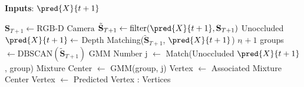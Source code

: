 \begin{algorithm}[t]
\caption{State Estimation with Presence of Occlusion} 
\label{code:state estimation}
\textbf{Inputs}: $\pred{X}{t+1}$
\begin{algorithmic}[1]
\State $\textbf{S}_{T+1} \leftarrow \text{RGB-D Camera}$
\State $\tilde{\textbf{S}}_{T+1} \leftarrow \text{filter}(\pred{X}{t+1}, \textbf{S}_{T+1})$
\State Unoccluded $\pred{X}{t+1} \leftarrow $ Depth Matching($\tilde{\textbf{S}}_{T+1}$, $\pred{X}{t+1}$)
\State $n_{\tilde{}}+1$ groups $\leftarrow \text{DBSCAN}(\tilde{\textbf{S}}_{T+1})$
\State GMM Number j $\leftarrow $ Match(Unoccluded $\pred{X}{t+1}$, group)
\State Mixture Center $\leftarrow$ GMM(group,  j)
\EndFor
\State Vertex $\leftarrow$ Associated Mixture Center
\Else
\State Vertex $\leftarrow$ Predicted Vertex
\EndIf{}
\EndFor
\State \Return: Vertices
\end{algorithmic}
\end{algorithm}

